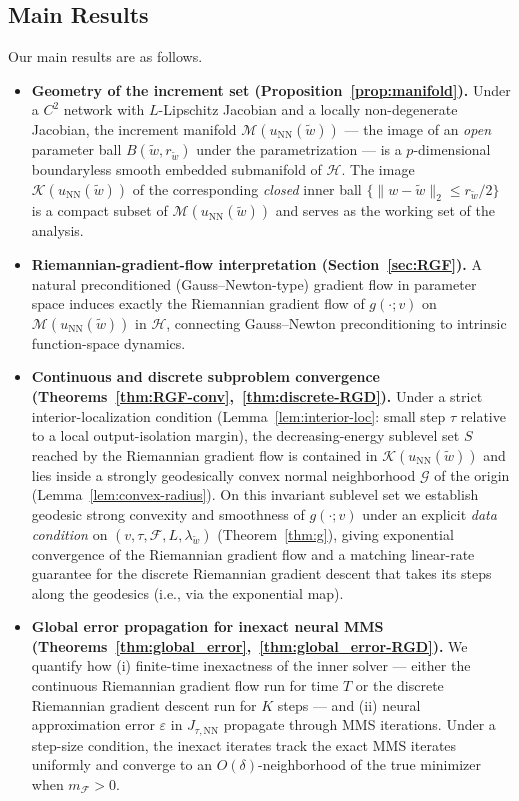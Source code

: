 \documentclass[twoside,11pt]{article}
\newcommand{\NN}{\mathrm{NN}}
\newcommand{\calF}{\mathcal{F}}
\newcommand{\calG}{\mathcal{G}}
\newcommand{\calH}{\mathcal{H}}
\newcommand{\calK}{\mathcal{K}}
\newcommand{\calM}{\mathcal{M}}
\begin{document}
\subsection{Main Results}\label{sec:intro:main-results}
Our main results are as follows.
\begin{itemize}
  \item \textbf{Geometry of the increment set (Proposition~\ref{prop:manifold}).}
  Under a $C^2$ network with $L$-Lipschitz Jacobian and a locally non-degenerate Jacobian, the increment manifold $\calM(u_\NN(\tilde w))$ --- the image of an \emph{open} parameter ball $B(\tilde w,r_{\tilde w})$ under the parametrization --- is a $p$-dimensional boundaryless smooth embedded submanifold of $\calH$. The image $\calK(u_\NN(\tilde w))$ of the corresponding \emph{closed} inner ball $\{\|w-\tilde w\|_2\le r_{\tilde w}/2\}$ is a compact subset of $\calM(u_\NN(\tilde w))$ and serves as the working set of the analysis.

  \item \textbf{Riemannian-gradient-flow interpretation (Section~\ref{sec:RGF}).}
  A natural preconditioned (Gauss--Newton-type) gradient flow in parameter space induces exactly the Riemannian gradient flow of $g(\cdot;v)$ on $\calM(u_\NN(\tilde w))$ in $\calH$, connecting Gauss--Newton preconditioning to intrinsic function-space dynamics.

  \item \textbf{Continuous and discrete subproblem convergence (Theorems~\ref{thm:RGF-conv},~\ref{thm:discrete-RGD}).}
  Under a strict interior-localization condition (Lemma~\ref{lem:interior-loc}: small step $\tau$ relative to a local output-isolation margin), the decreasing-energy sublevel set $S$ reached by the Riemannian gradient flow is contained in $\calK(u_\NN(\tilde w))$ and lies inside a strongly geodesically convex normal neighborhood $\calG$ of the origin (Lemma~\ref{lem:convex-radius}). On this invariant sublevel set we establish geodesic strong convexity and smoothness of $g(\cdot;v)$ under an explicit \emph{data condition} on $(v,\tau,\calF,L,\lambda_{\tilde w})$ (Theorem~\ref{thm:g}), giving exponential convergence of the Riemannian gradient flow and a matching linear-rate guarantee for the discrete Riemannian gradient descent that takes its steps along the geodesics (i.e., via the exponential map).

  \item \textbf{Global error propagation for inexact neural MMS (Theorems~\ref{thm:global_error},~\ref{thm:global_error-RGD}).}
  We quantify how (i) finite-time inexactness of the inner solver --- either the continuous Riemannian gradient flow run for time $T$ or the discrete Riemannian gradient descent run for $K$ steps --- and (ii) neural approximation error $\varepsilon$ in $J_{\tau,\NN}$ propagate through MMS iterations. Under a step-size condition, the inexact iterates track the exact MMS iterates uniformly and converge to an $O(\delta)$-neighborhood of the true minimizer when $m_\calF>0$.


\end{itemize}
\end{document}
